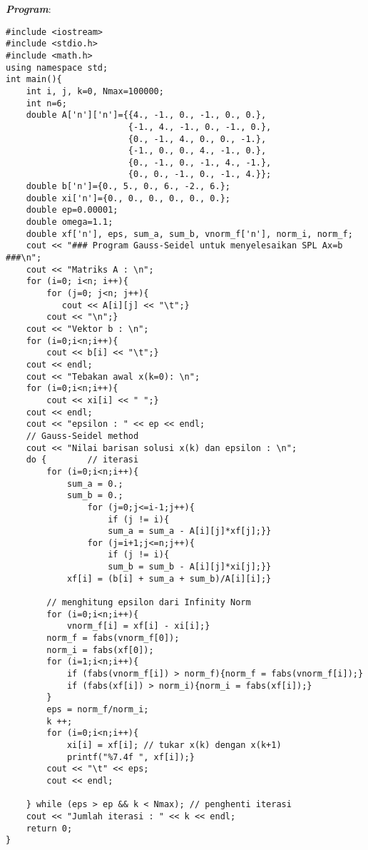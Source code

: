 \documentclass[paper=a4, fontsize=11pt]{scrartcl}
\numberwithin{equation}{section} %
\numberwithin{figure}{section} %
\numberwithin{table}{section} %
\begin{document}
\textit{\textbf{Program}}:
\begin{small}
\begin{verbatim}
#include <iostream>
#include <stdio.h>
#include <math.h>
using namespace std;
int main(){    
    int i, j, k=0, Nmax=100000;
    int n=6;
    double A['n']['n']={{4., -1., 0., -1., 0., 0.},
                        {-1., 4., -1., 0., -1., 0.},
                        {0., -1., 4., 0., 0., -1.},
                        {-1., 0., 0., 4., -1., 0.},
                        {0., -1., 0., -1., 4., -1.},
                        {0., 0., -1., 0., -1., 4.}};
    double b['n']={0., 5., 0., 6., -2., 6.};
    double xi['n']={0., 0., 0., 0., 0., 0.};
    double ep=0.00001;
    double omega=1.1;
    double xf['n'], eps, sum_a, sum_b, vnorm_f['n'], norm_i, norm_f;
    cout << "### Program Gauss-Seidel untuk menyelesaikan SPL Ax=b ###\n";    
    cout << "Matriks A : \n";
    for (i=0; i<n; i++){
        for (j=0; j<n; j++){ 
           cout << A[i][j] << "\t";}
        cout << "\n";}
    cout << "Vektor b : \n";
    for (i=0;i<n;i++){
        cout << b[i] << "\t";}
    cout << endl;
    cout << "Tebakan awal x(k=0): \n";
    for (i=0;i<n;i++){
        cout << xi[i] << " ";}
    cout << endl; 
    cout << "epsilon : " << ep << endl;
    // Gauss-Seidel method 
    cout << "Nilai barisan solusi x(k) dan epsilon : \n";
    do { 		// iterasi
        for (i=0;i<n;i++){
            sum_a = 0.;
            sum_b = 0.;
                for (j=0;j<=i-1;j++){
                    if (j != i){
                    sum_a = sum_a - A[i][j]*xf[j];}}
                for (j=i+1;j<=n;j++){
                    if (j != i){
                    sum_b = sum_b - A[i][j]*xi[j];}}
            xf[i] = (b[i] + sum_a + sum_b)/A[i][i];}
        
        // menghitung epsilon dari Infinity Norm
        for (i=0;i<n;i++){
            vnorm_f[i] = xf[i] - xi[i];}
        norm_f = fabs(vnorm_f[0]);
        norm_i = fabs(xf[0]);
        for (i=1;i<n;i++){
            if (fabs(vnorm_f[i]) > norm_f){norm_f = fabs(vnorm_f[i]);}
            if (fabs(xf[i]) > norm_i){norm_i = fabs(xf[i]);}
        }
        eps = norm_f/norm_i;
        k ++;      
        for (i=0;i<n;i++){
            xi[i] = xf[i]; // tukar x(k) dengan x(k+1)
            printf("%7.4f ", xf[i]);}
        cout << "\t" << eps;
        cout << endl;

    } while (eps > ep && k < Nmax); // penghenti iterasi
    cout << "Jumlah iterasi : " << k << endl;
    return 0;
}
\end{verbatim}
\end{small}
\end{document}
